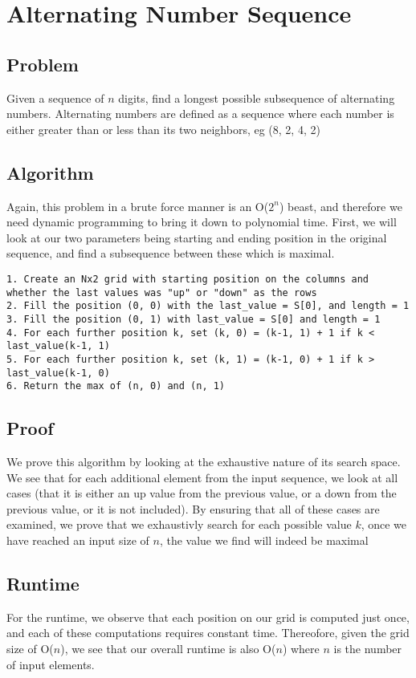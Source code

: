 \documentclass[titlepage]{article}
\begin{document}
\section{Alternating Number Sequence}
\subsection{Problem}
Given a sequence of $n$ digits, find a longest possible subsequence of alternating numbers. Alternating numbers are defined as a sequence where
each number is either greater than or less than its two neighbors, eg (8, 2, 4, 2)
\subsection{Algorithm}
Again, this problem in a brute force manner is an O($2^n$) beast, and therefore we need dynamic programming to bring it down to polynomial time.
First, we will look at our two parameters being starting and ending position in the original sequence, and find a subsequence between these
which is maximal.
\begin{lstlisting}
1. Create an Nx2 grid with starting position on the columns and whether the last values was "up" or "down" as the rows
2. Fill the position (0, 0) with the last_value = S[0], and length = 1
3. Fill the position (0, 1) with last_value = S[0] and length = 1
4. For each further position k, set (k, 0) = (k-1, 1) + 1 if k < last_value(k-1, 1)
5. For each further position k, set (k, 1) = (k-1, 0) + 1 if k > last_value(k-1, 0)
6. Return the max of (n, 0) and (n, 1)
\end{lstlisting}
\subsection{Proof}
We prove this algorithm by looking at the exhaustive nature of its search space. We see that for each additional element from the input sequence,
we look at all cases (that it is either an up value from the previous value, or a down from the previous value, or it is not included). 
By ensuring that all of these cases are examined, we prove that we exhaustivly search for each possible value $k$, once we have reached an input
size of $n$, the value we find will indeed be maximal
\subsection{Runtime}
For the runtime, we observe that each position on our grid is computed just once, and each of these computations requires constant time. Thereofore,
given the grid size of O($n$), we see that our overall runtime is also O($n$) where $n$ is the number of input elements.
\end{document}
